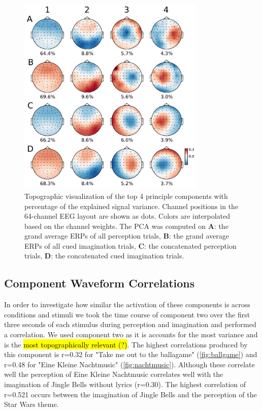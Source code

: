 \begin{figure}[t] 
  \begin{center}
    \includegraphics[width=0.8\textwidth,keepaspectratio=true]{Figures/principle_components.pdf}
    \caption{%
Topographic visualization of the top 4 principle components with percentage of the explained signal variance. %
Channel positions in the 64-channel EEG layout are shown as dots.
Colors are interpolated based on the channel weights.
The PCA was computed on
\textbf{A}: the grand average \acp{ERP} of all perception trials,
\textbf{B}: the grand average \acp{ERP} of all cued imagination trials,
\textbf{C}: the concatenated perception trials,
\textbf{D}: the concatenated cued imagination trials.
}
    \label{fig:components}
  \end{center}
\end{figure}

\subsection*{Component Waveform Correlations}
In order to investigate how similar the activation of these components is across conditions and stimuli we took the time course of component two over the first three seconds of each stimulus during perception and imagination and performed a correlation.
We used component two as it is accounts for the most variance and is the \hl{most topographically relevant (?)}.
The highest correlations produced by this component is r=0.32 for "Take me out to the ballagame" (\autoref{fig:ballgame}) and r=0.48 for "Eine Kleine Nachtmusic" (\autoref{fig:nachtmusic}).
Although these correlate well the perception of Eine Kleine Nachtmusic correlates well with the imagination of Jingle Bells without lyrics (r=0.30). 
The highest correlation of r=0.521 occurs between the imagination of Jingle Bells and the perception of the Star Wars theme. 

